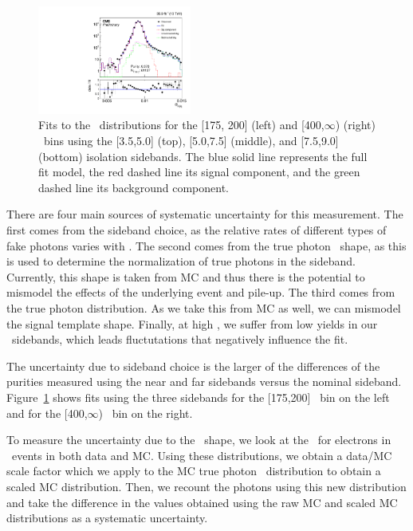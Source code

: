 \begin{figure}[htbp]
  \includegraphics[width=0.45\textwidth]{Calibration/Figures/pvsf/ssfit_400_medium_far_logy.pdf}
  \caption{
    Fits to the \sieie\ distributions for the [175, 200] (left) and [400,$\infty$) (right) \pt\ bins using the [3.5,5.0] (top), [5.0,7.5] (middle), and [7.5,9.0] (bottom) isolation sidebands.
      The blue solid line represents the full fit model, the red dashed line its signal component, and the green dashed line its background component.
    }
  \label{fig:impurity-sideband}
\end{figure}

There are four main sources of systematic uncertainty for this measurement. 
The first comes from the sideband choice, as the relative rates of different types of fake photons varies with \ICH. 
The second comes from the true photon \ICH\ shape, as this is used to determine the normalization of true photons in the sideband. 
Currently, this shape is taken from MC and thus there is the potential to mismodel the effects of the underlying event and pile-up. 
The third comes from the true photon \sieie distribution. 
As we take this from MC as well, we can mismodel the signal template shape. 
Finally, at high \pt, we suffer from low yields in our \ICH\ sidebands, which leads fluctutations that negatively influence the fit.

The uncertainty due to sideband choice is the larger of the differences of the purities measured using the near and far sidebands versus the nominal sideband. 
Figure~\ref{fig:impurity-sideband} shows fits using the three sidebands for the [175,200] \pt\ bin on the left and for the [400,$\infty$) \pt\ bin on the right.

To measure the uncertainty due to the \ICH\ shape, we look at the \ICH\ for electrons in \Zee\ events in both data and MC. 
Using these distributions, we obtain a data/MC scale factor which we apply to the MC true photon \ICH\ distribution to obtain a scaled MC distribution. 
Then, we recount the photons using this new distribution and take the difference in the values obtained using the raw MC and scaled MC distributions as a systematic uncertainty.

